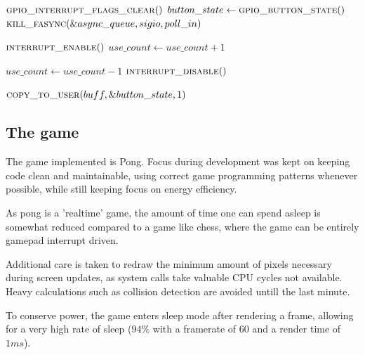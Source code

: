 \begin{algorithmic}
  \footnotesize
    \State $\Call{gpio\_interrupt\_flags\_clear}{\null}$
    \State $button\_state \gets \Call{gpio\_button\_state}{\null}$
      \State $\Call{kill\_fasync}{\&async\_queue, sigio, poll\_in}$
    \EndIf
  \EndFunction
\end{algorithmic}

\begin{algorithmic}
  \footnotesize
      \State $\Call{interrupt\_enable}{\null}$
    \EndIf
    \State $use\_count \gets use\_count + 1$
  \EndFunction
\end{algorithmic}

\begin{algorithmic}
  \footnotesize
    \State $use\_count \gets use\_count - 1$
      \State $\Call{interrupt\_disable}{\null}$
    \EndIf
  \EndFunction
\end{algorithmic}

\begin{algorithmic}
  \footnotesize
    \State $\Call{copy\_to\_user}{buff, \&button\_state, 1}$
  \EndFunction
\end{algorithmic}

\subsection{The game}

The game implemented is Pong. Focus during development was kept on keeping code
clean and maintainable, using correct game programming patterns whenever
possible, while still keeping focus on energy efficiency.

As pong is a 'realtime' game, the amount of time one can spend asleep is
somewhat reduced compared to a game like chess,
where the game can be entirely gamepad interrupt driven.

Additional care is taken to redraw the minimum amount of pixels necessary
during screen updates, as system calls take valuable CPU cycles not available.
Heavy calculations such as collision detection are avoided untill the last
minute.

To conserve power, the game enters sleep mode after rendering a frame,
allowing for a very high rate of sleep
($ 94\% $ with a framerate of $ 60 $ and a render time of $ 1 ms $).

